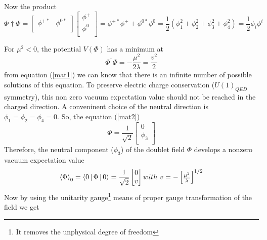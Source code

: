 Now the product
    \begin{equation}\label{mat1}
    \Phi{\dagger}\Phi=
        \begin{bmatrix}
        \phi^{+*}   &   \phi^{0*} \\
        \end{bmatrix}
        \begin{bmatrix}
        \phi^+  \\
        \phi^0  \\
        \end{bmatrix}
    =\phi^{+*} \phi^+ + \phi^{0*}\phi^0
    =\frac{1}{2}(\phi^2_1+\phi^2_2+\phi^2_3+\phi^2_4)
    =\frac{1}{2}\phi_i \phi^i
    \end{equation}
    
For $\mu^2<0$, the potential $V(\Phi)$ has a minimum at
    \begin{equation}
    \Phi^{\dagger}\Phi = -\frac{\mu^2}{2\lambda}=\frac{v^2}{2}
    \end{equation}
from equation (\ref{mat1}) we can know that there is an infinite number of possible solutions of this equation. To preserve electric charge conservation ($U(1)_{QED}$ symmetry), this non zero vacuum expectation value should not be reached in the charged direction. A conveninent choice of the neutral direction is $\phi_1 = \phi_2 = \phi_4 = 0$. So, the equation (\ref{mat2})
    \begin{equation}
    \Phi=\frac{1}{\sqrt{2}}
        \begin{bmatrix}
        0   \\
        \phi_3  \\
        \end{bmatrix}
    \end{equation}
Therefore, the neutral component ($\phi_3$) of the doublet field $\Phi$ develops a nonzero vacuum expectation value
\begin{equation}
{\Braket\Phi}_0 = \Braket{0|\Phi|0}=\frac{1}{\sqrt{2}}
        \begin{bmatrix}
        0   \\
        v   \\
        \end{bmatrix}
        with~
        v=-
        \begin{bmatrix}
        \frac{\mu^2}{\lambda}
        \end{bmatrix}
        ^{1/2}
\end{equation}
Now by using the unitarity gauge\footnote{It removes the unphysical degree of freedom} means of proper gauge transformation of the field we get
